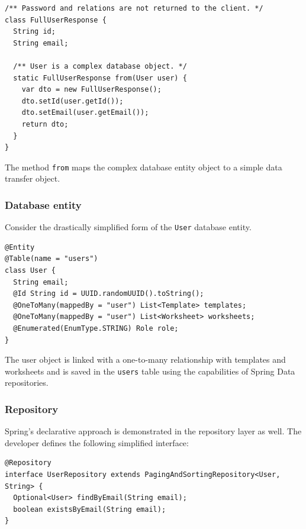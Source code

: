 \documentclass[a4paper,twoside,12pt]{book}
\begin{document}
\begin{verbatim}
/** Password and relations are not returned to the client. */
class FullUserResponse {
  String id;
  String email;

  /** User is a complex database object. */
  static FullUserResponse from(User user) {
    var dto = new FullUserResponse();
    dto.setId(user.getId());
    dto.setEmail(user.getEmail());
    return dto;
  }
}
\end{verbatim}

The method \texttt{from} maps the complex database entity object to a simple data transfer object.

\subsubsection{Database entity}

Consider the drastically simplified form of the \verb|User| database entity.

\begin{verbatim}
@Entity
@Table(name = "users")
class User {
  String email;
  @Id String id = UUID.randomUUID().toString();
  @OneToMany(mappedBy = "user") List<Template> templates;
  @OneToMany(mappedBy = "user") List<Worksheet> worksheets;
  @Enumerated(EnumType.STRING) Role role;
}
\end{verbatim}

The user object is linked with a one-to-many relationship with templates and worksheets and is saved in the \verb|users| table using the capabilities of Spring Data repositories.

\subsubsection{Repository}

Spring's declarative approach is demonstrated in the repository layer as well. The developer defines the following simplified interface:
\begin{verbatim}
@Repository
interface UserRepository extends PagingAndSortingRepository<User, String> {
  Optional<User> findByEmail(String email);
  boolean existsByEmail(String email);
}
\end{verbatim}
\end{document}
